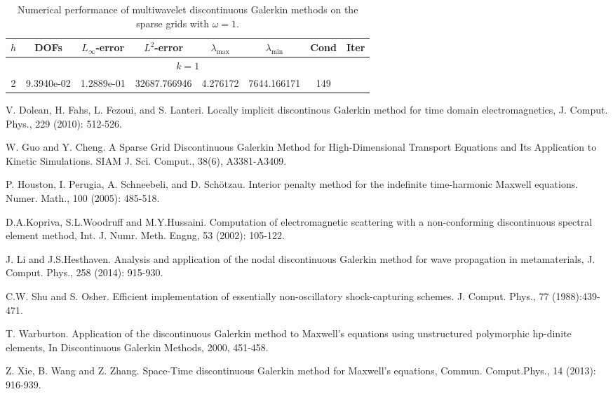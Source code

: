 \documentclass[final,leqno]{siamltex704}
\begin{document}
\begin{table}
\caption{Numerical performance of multiwavelet discontinuous Galerkin methods on the sparse grids with $\omega=1.$}
\begin{tabular}{cccccccc}\hline\hline
$h$ & DOFs & $L_{\infty}$-error & $L^2$-error & $\lambda_{\max}$ & $\lambda_{\min}$ & Cond & Iter \\ \hline
\multicolumn{8}{c}{$k=1$}\\ \hline
2           &9.3940e-02   &1.2889e-01 &32687.766946 &4.276172 &7644.166171 &149 \\ \hline
\end{tabular}
\end{table}




\begin{thebibliography}{99}
V. Dolean, H. Fahs, L. Fezoui, and S. Lanteri. Locally implicit discontinous Galerkin method for time domain electromagnetics, J. Comput. Phys., 229 (2010): 512-526.

W. Guo and Y. Cheng. A Sparse Grid Discontinuous Galerkin Method for High-Dimensional Transport Equations and Its Application to Kinetic Simulations. SIAM J. Sci. Comput., 38(6), A3381-A3409. 

P. Houston, I. Perugia, A. Schneebeli, and D. Sch\"{o}tzau. Interior penalty method for the indefinite time-harmonic
Maxwell equations. Numer. Math., 100 (2005): 485-518.

D.A.Kopriva, S.L.Woodruff and M.Y.Hussaini. Computation of electromagnetic scattering with a non-conforming discontinuous spectral element method, Int. J. Numr. Meth. Engng, 53 (2002): 105-122.

J. Li and J.S.Hesthaven. Analysis and application of the nodal discontinuous Galerkin method for wave propagation in metamaterials, J. Comput. Phys., 258 (2014): 915-930.

C.W. Shu and S. Osher. Efficient implementation of essentially non-oscillatory shock-capturing schemes. J. Comput.
Phys., 77 (1988):439-471.


T. Warburton. Application of the discontinuous Galerkin method to Maxwell's equations using unstructured polymorphic hp-dinite elements, In Discontinuous Galerkin Methods, 2000, 451-458.

Z. Xie, B. Wang and Z. Zhang. Space-Time discontinuous Galerkin method for Maxwell's equations, Commun. Comput.Phys., 14 (2013): 916-939.



\end{thebibliography}
\end{document}
